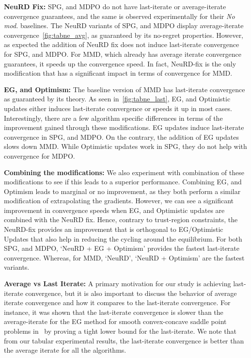 \textbf{NeuRD Fix:}
SPG, and MDPO do not have last-iterate or average-iterate convergence guarantees, and the same is
observed experimentally for their \textit{No mod.
} baselines.
The NeuRD variants of SPG, and MDPO display average-iterate convergence~\ref{fig:tabne_avg}, as
guaranteed by its no-regret properties.
However, as expected the addition of NeuRD fix does not induce last-iterate convergence for SPG,
and MDPO.
For MMD, which already has average iterate convergence guarantees, it speeds up the convergence
speed.
In fact, NeuRD-fix is the only modification that has a significant impact in terms of convergence
for MMD.

\textbf{EG, and Optimism:}
The baseline version of MMD has last-iterate convergence as guaranteed by its theory.
As seen in~\ref{fig:tabne_last}, EG, and Optimistic updates either induces last-iterate convergence
or speeds it up in most cases.
Interestingly, there are a few algorithm specific differences in terms of the improvement gained
through these modifications.
EG updates induce last-iterate convergence in SPG, and MDPO.
On the contrary, the addition of EG updates slows down MMD.
While Optimistic updates work in SPG, they do not help with convergence for MDPO.

\textbf{Combining the modifications:}
We also experiment with combination of these modifications to see if this leads to a superior
performance.
Combining EG, and Optimism leads to marginal or no improvement, as they both perform a similar
modification of extrapolating the gradients.
However, we can see a significant improvement in convergence speeds when EG, and Optimistic updates
are combined with the NeuRD fix.
Hence, contrary to trust-region constraints, the NeuRD-fix provides an improvement that is
orthogonal to EG/Optimistic Updates that also help in reducing the cycling around the equilibrium.
For both SPG, and MDPO, `NeuRD + EG + Optimism' provides the fastest last-iterate convergence.
Whereas, for MMD, `NeuRD', `NeuRD + Optimism' are the fastest variants.

\textbf{Average vs Last Iterate:}
A primary motivation for our study is achieving last-iterate convergence, but it is also important
to discuss the behavior of average iterate convergence and how it compares to the last-iterate
convergence.
For instance, it was shown that the last-iterate convergence is slower than the average-iterate for
the EG method for smooth convex-concave saddle point problems in~\cite{golowichLast2020} by proving
a tight lower bound for the last-iterate.
We note that from our tabular experimental results, the last-iterate convergence is better than the
average iterate for all the algorithms.

